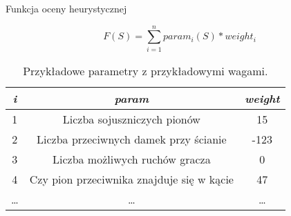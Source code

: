 \begin{frame}{Funkcja oceny heurystycznej}

	\[ F(S) = \sum_{i=1}^{n} param_i(S) * weight_i \]

	\vspace{.5cm}

	\begin{table}[h]
		\centering
		{\small
		\begin{tabular}{|c|c|c|}
		\hline
			\textit{i} & \textit{param} & \textit{weight} \\ 
		\hline
			1 & Liczba sojuszniczych pionów & 15\\ 
		\hline
			2 & Liczba przeciwnych damek przy ścianie & -123\\ 
		\hline
			3 & Liczba możliwych ruchów gracza & 0 \\
		\hline
			4 & Czy pion przeciwnika znajduje się w kącie & 47 \\
		\hline
			\ldots & \ldots & \ldots \\
		\hline
		\end{tabular}
		}
		\caption{Przykładowe parametry z przykładowymi wagami.}
	\end{table}

\end{frame}


